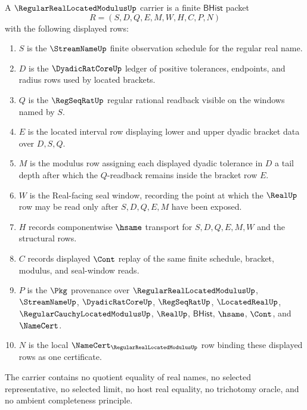 \begin{definition}
\label{def:regular-real-located-modulus-carrier}
A $\RegularRealLocatedModulusUp$ carrier is a finite $\mathsf{BHist}$ packet
$$
R=(S,D,Q,E,M,W,H,C,P,N)
$$
with the following displayed rows:
\begin{enumerate}
\item $S$ is the $\StreamNameUp$ finite observation schedule for the regular real name.
\item $D$ is the $\DyadicRatCoreUp$ ledger of positive tolerances, endpoints, and radius rows used by located brackets.
\item $Q$ is the $\RegSeqRatUp$ regular rational readback visible on the windows named by $S$.
\item $E$ is the located interval row displaying lower and upper dyadic bracket data over $D,S,Q$.
\item $M$ is the modulus row assigning each displayed dyadic tolerance in $D$ a tail depth after which the $Q$-readback remains inside the bracket row $E$.
\item $W$ is the Real-facing seal window, recording the point at which the $\RealUp$ row may be read only after $S,D,Q,E,M$ have been exposed.
\item $H$ records componentwise $\hsame$ transport for $S,D,Q,E,M,W$ and the structural rows.
\item $C$ records displayed $\Cont$ replay of the same finite schedule, bracket, modulus, and seal-window reads.
\item $P$ is the $\Pkg$ provenance over $\RegularRealLocatedModulusUp$, $\StreamNameUp$, $\DyadicRatCoreUp$, $\RegSeqRatUp$, $\LocatedRealUp$, $\RegularCauchyLocatedModulusUp$, $\RealUp$, $\mathsf{BHist}$, $\hsame$, $\Cont$, and $\NameCert$.
\item $N$ is the local $\NameCert_{\RegularRealLocatedModulusUp}$ row binding these displayed rows as one certificate.
\end{enumerate}
The carrier contains no quotient equality of real names, no selected representative, no selected limit, no host real equality, no trichotomy oracle, and no ambient completeness principle.
\end{definition}

